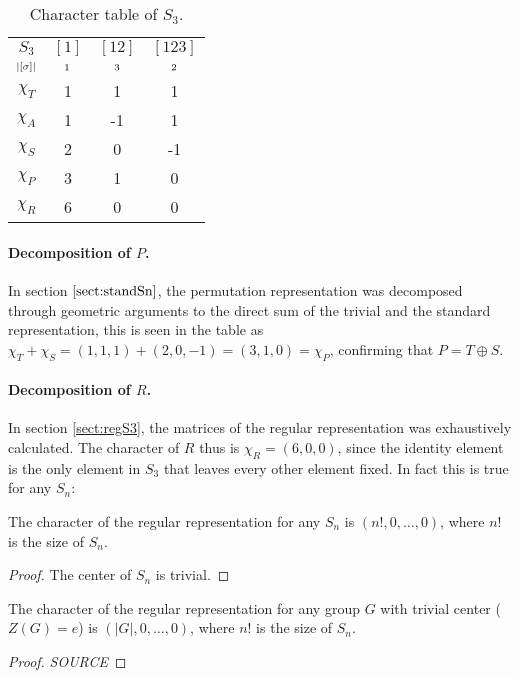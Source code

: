 \begin{table}[hbt!]
	\centering
	\begin{tabular}{c | c c c}
		$S_3$      & $[1]$   & $[12]$  & $[123]$ \\
		$\scriptstyle|[\sigma]|$ & $\scriptstyle 1$ & $\scriptstyle 3$ & $\scriptstyle 2$ \\ \hline
		$\chi_T$     & 1       & 1       & 1       \\
		$\chi_A$     & 1       & -1      & 1       \\
		$\chi_S$     & 2       & 0       & -1      \\ \hline\hline
		$\chi_P$     & 3       & 1       & 0       \\
		$\chi_R$     & 6       & 0       & 0
	\end{tabular}
	\caption{Character table of $S_3$.}
\end{table}

\paragraph{Decomposition of $P$.} In section $\ref{sect:standSn}$, the permutation representation was decomposed through geometric arguments to the direct sum of the trivial and the standard representation, this is seen in the table as $\chi_T + \chi_S = (1,1,1) + (2,0,-1) = (3,1,0) = \chi_P$, confirming that $P = T \oplus S$. 

\paragraph{Decomposition of $R$.} In section \ref{sect:regS3}, the matrices of the regular representation was exhaustively calculated. The character of $R$ thus is $\chi_R = (6,0,0)$, since the identity element is the only element in $S_3$ that leaves every other element fixed. In fact this is true for any $S_n$:
\begin{corollary}\label{thm:charregSn}
	The character of the regular representation for any $S_n$ is $(n!, 0, \dots, 0)$, where $n!$ is the size of $S_n$.
\end{corollary}
\begin{proof}
	The center of $S_n$ is trivial.
\end{proof}
\begin{corollary}
	The character of the regular representation for any group $G$ with trivial center ($Z(G)={e}$) is $(|G|, 0, \dots, 0)$, where $n!$ is the size of $S_n$.
\end{corollary}
\begin{proof}
	\textit{SOURCE}
\end{proof}

